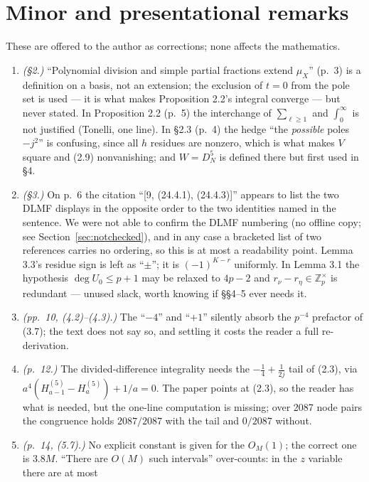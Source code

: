 \documentclass[11pt]{article}
\theoremstyle{definition}
\begin{document}
\section{Minor and presentational remarks}

These are offered to the author as corrections; none affects the mathematics.

\begin{enumerate}
\item \emph{(\S2.)} ``Polynomial division and simple partial fractions extend $\mu_X$'' (p.~3) is
a definition on a basis, not an extension; the exclusion of $t=0$ from the pole set is used ---
it is what makes Proposition 2.2's integral converge --- but never stated. In Proposition 2.2
(p.~5) the interchange of $\sum_{\ell\ge1}$ and $\int_0^\infty$ is not justified (Tonelli, one
line). In \S2.3 (p.~4) the hedge ``the \emph{possible} poles $-j^2$'' is confusing, since all $h$
residues are nonzero, which is what makes $V$ square and (2.9) nonvanishing; and $W=D_N^5$ is
defined there but first used in \S4.
\item \emph{(\S3.)} On p.~6 the citation ``[9, (24.4.1), (24.4.3)]'' appears to list the two
DLMF displays in the opposite order to the two identities named in the sentence. We were not
able to confirm the DLMF numbering (no offline copy; see Section~\ref{sec:notchecked}), and in
any case a bracketed list of two references carries no ordering, so this is at most a
readability point. Lemma 3.3's residue sign is left as
``$\pm$''; it is $(-1)^{K-r}$ uniformly. In Lemma 3.1 the hypothesis $\deg U_0\le p+1$ may be
relaxed to $4p-2$ and $r_\nu-r_\eta\in\mathbb{Z}_p^\times$ is redundant --- unused slack, worth
knowing if \S\S4--5 ever needs it.
\item \emph{(pp.~10, (4.2)--(4.3).)} The ``$-4$'' and ``$+1$'' silently absorb the $p^{-4}$
prefactor of (3.7); the text does not say so, and settling it costs the reader a full
re-derivation.
\item \emph{(p.~12.)} The divided-difference integrality needs the $-\tfrac14+\tfrac1{2j}$ tail
of (2.3), via $a^4(H^{(5)}_{a-1}-H^{(5)}_a)+1/a=0$. The paper points at (2.3), so the reader has
what is needed, but the one-line computation is missing; over 2087 node pairs the congruence
holds $2087/2087$ with the tail and $0/2087$ without.
\item \emph{(p.~14, (5.7).)} No explicit constant is given for the $O_M(1)$; the correct one is
$3.8M$. ``There are $O(M)$ such intervals'' over-counts: in the $z$ variable there are at most

\end{enumerate}
\end{document}
